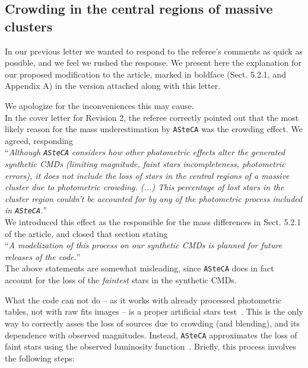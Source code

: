 \documentclass{article}
\begin{document}
%
\subsection{Crowding in the central regions of massive clusters}
\label{sec:C}

In our previous letter we wanted to respond to the referee's comments as quick
as possible, and we feel we rushed the response.
We present here the explanation for our proposed modification to the article,
marked in boldface (Sect. 5.2.1, and Appendix A) in the version attached along
with this letter.

We apologize for the inconveniences this may cause.\\

In the cover letter for Revision 2, the referee correctly pointed out that the
most likely reason for the mass underestimation by \texttt{ASteCA} was the
crowding effect. We agreed, responding\\


\noindent ``\emph{Although \texttt{ASteCA} considers how other photometric effects
alter the generated synthetic CMDs (limiting magnitude, faint stars
incompleteness, photometric errors), it does not include the loss of stars in
the central regions of a massive cluster due to photometric crowding.
(...) This percentage of lost stars in the cluster region couldn't be
accounted for by any of the photometric process included in \texttt{ASteCA}.}''\\

We introduced this effect as the responsible for the mass differences in Sect.
5.2.1 of the article, and closed that section stating\\

\noindent ``\emph{A modelization of this process on our synthetic CMDs is
planned for future releases of the code.}''\\

The above statements are somewhat misleading, since \texttt{ASteCA} does in fact
account for the loss of the \emph{faintest} stars in the synthetic CMDs.

What the code can not do -- as it works with already processed photometric
tables, not with raw fits images -- is a proper artificial stars
test~\citep[as described e.g. in][]{Aparicio_Gallart_1995}. This
is the only way to correctly asses the loss of sources due to crowding (and
blending), and its dependence with observed magnitudes. Instead, \texttt{ASteCA}
approximates the loss of faint stars using the observed luminosity
function~\citep[mentioned in][]{Perren_2015}.
Briefly, this process involves the following steps:
\end{document}
